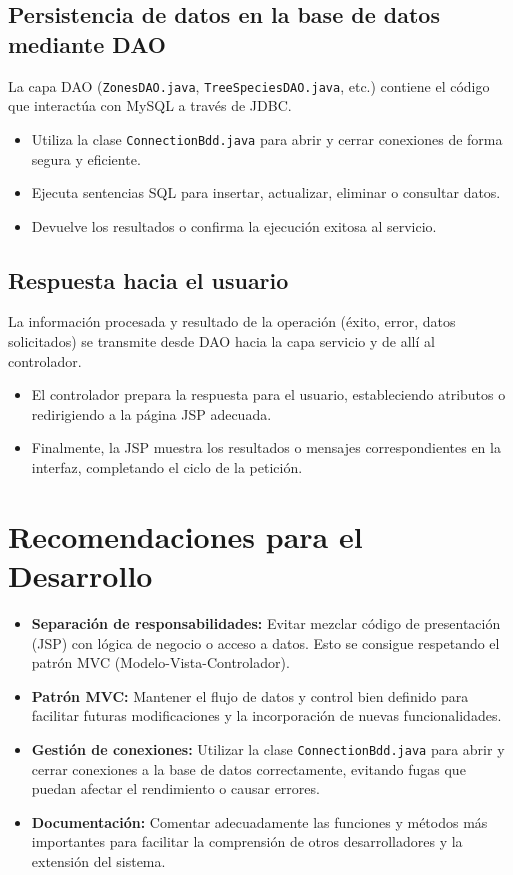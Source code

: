 \subsection{Persistencia de datos en la base de datos mediante DAO}
La capa DAO (\texttt{ZonesDAO.java}, \texttt{TreeSpeciesDAO.java}, etc.) contiene el código que interactúa con MySQL a través de JDBC.
\begin{itemize}
    \item Utiliza la clase \texttt{ConnectionBdd.java} para abrir y cerrar conexiones de forma segura y eficiente.
    \item Ejecuta sentencias SQL para insertar, actualizar, eliminar o consultar datos.
    \item Devuelve los resultados o confirma la ejecución exitosa al servicio.
\end{itemize}

\subsection{Respuesta hacia el usuario}
La información procesada y resultado de la operación (éxito, error, datos solicitados) se transmite desde DAO hacia la capa servicio y de allí al controlador.
\begin{itemize}
    \item El controlador prepara la respuesta para el usuario, estableciendo atributos o redirigiendo a la página JSP adecuada.
    \item Finalmente, la JSP muestra los resultados o mensajes correspondientes en la interfaz, completando el ciclo de la petición.
\end{itemize}

\section{Recomendaciones para el Desarrollo}
\begin{itemize}
    \item \textbf{Separación de responsabilidades:} Evitar mezclar código de presentación (JSP) con lógica de negocio o acceso a datos. Esto se consigue respetando el patrón MVC (Modelo-Vista-Controlador).
    \item \textbf{Patrón MVC:} Mantener el flujo de datos y control bien definido para facilitar futuras modificaciones y la incorporación de nuevas funcionalidades.
    \item \textbf{Gestión de conexiones:} Utilizar la clase \texttt{ConnectionBdd.java} para abrir y cerrar conexiones a la base de datos correctamente, evitando fugas que puedan afectar el rendimiento o causar errores.
    \item \textbf{Documentación:} Comentar adecuadamente las funciones y métodos más importantes para facilitar la comprensión de otros desarrolladores y la extensión del sistema.
\end{itemize}

